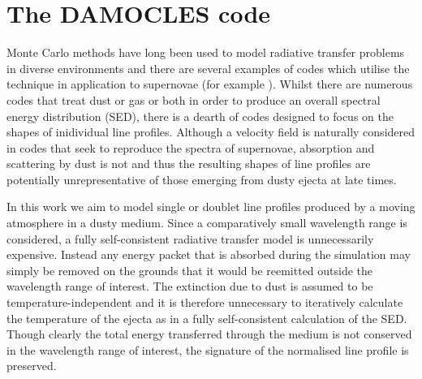 \documentclass[useAMS,usenatbib,usegraphicx]{mnras}
\begin{document}





\section{The DAMOCLES code}
\label{code}

Monte Carlo methods have long been used to model radiative transfer 
problems in diverse environments and there are several examples of codes 
which utilise the technique in application to supernovae 
(for example \citet{Maeda2003, Lucy2005c, Jerkstrand2012,Owen2015}).  Whilst there are numerous codes that 
treat dust or gas or both in order to produce an overall spectral energy 
distribution (SED), there is a dearth of codes designed to focus on the 
shapes of inidividual line profiles.  Although a velocity field is naturally 
considered in codes that seek to reproduce the spectra of supernovae, 
absorption and scattering by dust is not and thus the resulting shapes of 
line profiles are potentially unrepresentative of those emerging from 
dusty ejecta at late times.

In this work we aim to model single or doublet line profiles produced by 
a moving atmosphere in a dusty medium.  
Since a comparatively small wavelength range is considered, a fully 
self-consistent radiative transfer model is unnecessarily expensive.  
Instead any energy packet that is absorbed during the simulation may 
simply be removed on the grounds that it would be 
reemitted outside the wavelength range of interest. The extinction due to 
dust is assumed to be temperature-independent and it is therefore 
unnecessary to iteratively calculate the temperature of the ejecta as in a 
fully self-consistent calculation of the SED.  Though clearly the total 
energy transferred through the medium is not conserved in the wavelength range of interest, the signature of 
the normalised line profile is preserved.
\end{document}
